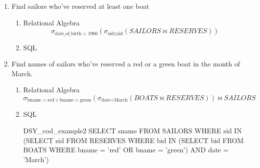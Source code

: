 \begin{enumerate}
    \item  Find sailors who've reserved at least one boat
          \begin{enumerate}
              \item Relational Algebra
                    \begin{equation*}
                        \sigma_{\text{date\_of\_birth} < 1960}(\sigma_{\text{sid} \in \text{sid}}(SAILORS \bowtie RESERVES))
                    \end{equation*}

              \item  SQL \linebreak {}
          \end{enumerate}
          \vspace{1cm}

          \pagebreak
    \item Find names of sailors who've reserved a red or a green boat in the month of March.
          \begin{enumerate}
              \item Relational Algebra
                    \begin{equation*}
                        \sigma_{\text{bname} = \text{red} \lor \text{bname} = \text{green}}(\sigma_{\text{date} = \text{March}}(BOATS \bowtie RESERVES)) \bowtie SAILORS
                    \end{equation*}

              \item  SQL
                    \begin{sqlQuery}{DSY_cod_example2}
                        SELECT sname
                        FROM SAILORS
                        WHERE sid IN
                            (SELECT sid
                            FROM RESERVES
                            WHERE bid IN
                                (SELECT bid
                                FROM BOATS
                                WHERE bname = 'red' OR bname = 'green')
                            AND date = 'March')
                    \end{sqlQuery}

          \end{enumerate}
\end{enumerate}


\pagebreak